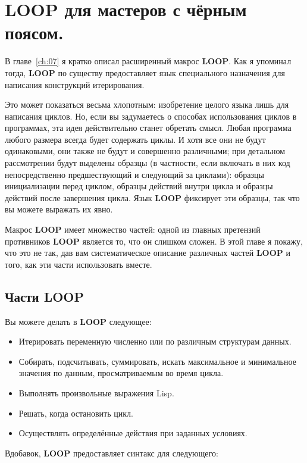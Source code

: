 \chapter{LOOP для мастеров с чёрным поясом.}
\label{ch:22}

В главе~\ref{ch:07} я кратко описал расширенный макрос \textbf{LOOP}. Как я упоминал
тогда, \textbf{LOOP} по существу предоставляет язык специального назначения для написания
конструкций итерирования.

Это может показаться весьма хлопотным: изобретение целого языка лишь для написания
циклов. Но, если вы задумаетесь о способах использования циклов в программах, эта идея
действительно станет обретать смысл. Любая программа любого размера всегда будет содержать
циклы. И хотя все они не будут одинаковыми, они также не будут и совершенно различными;
при детальном рассмотрении будут выделены образцы (в частности, если включать в них код
непосредственно предшествующий и следующий за циклами): образцы инициализации перед
циклом, образцы действий внутри цикла и образцы действий после завершения цикла. Язык
\textbf{LOOP} фиксирует эти образцы, так что вы можете выражать их явно.

Макрос \textbf{LOOP} имеет множество частей: одной из главных претензий противников
\textbf{LOOP} является то, что он слишком сложен. В этой главе я покажу, что это не так,
дав вам систематическое описание различных частей \textbf{LOOP} и того, как эти части
использовать вместе.

\section{Части LOOP}


Вы можете делать в \textbf{LOOP} следующее:

\begin{itemize}
\item Итерировать переменную численно или по различным структурам данных.
\item Собирать, подсчитывать, суммировать, искать максимальное и минимальное значения по
  данным, просматриваемым во время цикла.
\item Выполнять произвольные выражения Lisp.
\item Решать, когда остановить цикл.
\item Осуществлять определённые действия при заданных условиях.
\end{itemize}

Вдобавок, \textbf{LOOP} предоставляет синтакс для следующего:

